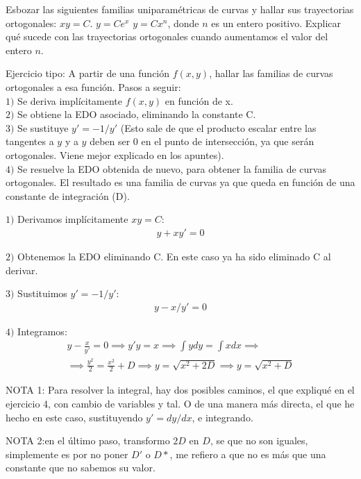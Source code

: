 \documentclass[nochap]{apuntes}
\begin{document}
\newpage
\begin{problem}[8]
Esbozar las siguientes familias uniparamétricas de curvas y hallar sus trayectorias ortogonales:
\ppart $xy=C$.
\ppart $y=Ce^x$
\ppart $y=Cx^n$, donde $n$ es un entero positivo. Explicar qué sucede con las trayectorias ortogonales cuando aumentamos el valor del entero $n$.

\solution

\begin{expla}
Ejercicio tipo: A partir de una función $f(x,y)$, hallar las familias de curvas ortogonales a esa función. Pasos a seguir:\\
$1)$ Se deriva implícitamente $f(x,y)$ en función de x.\\
$2)$ Se obtiene la EDO asociado, eliminando la constante C.\\
$3)$ Se sustituye $y'=-1/y'$ (Esto sale de que el producto escalar entre las tangentes a $y$ y a $y$ deben ser 0 en el punto de intersección, ya que serán ortogonales. Viene mejor explicado en los apuntes).\\
$4)$ Se resuelve la EDO obtenida de nuevo, para obtener la familia de curvas ortogonales. El resultado es una familia de curvas ya que queda en función de una constante de integración (D).
\end{expla}
\spart
$1)$ Derivamos implícitamente $xy=C$:
\begin{gather*}
y+xy'=0
\end{gather*}

$2)$ Obtenemos la EDO eliminando C. En este caso ya ha sido eliminado C al derivar.

$3)$ Sustituimos  $y'=-1/y'$:
\begin{gather*}
y-x/y'=0
\end{gather*}

$4)$ Integramos:
\begin{gather*}
y-\frac{x}{y'}=0 \implies y'y=x \implies \int ydy=\int xdx \implies \\ \implies \frac{y^2}{2}=\frac{x^2}{2}+D \implies y=\sqrt{x^2+2D} \implies y=\sqrt{x^2+D}
\end{gather*}

\begin{expla}
NOTA 1: Para resolver la integral, hay dos posibles caminos, el que expliqué en el ejercicio 4, con cambio de variables y tal. O de una manera más directa, el que he hecho en este caso, sustituyendo $y'=dy/dx$, e integrando.

NOTA 2:en el último paso, transformo $2D$ en $D$, se que no son iguales, simplemente es por no poner $D'$ o $D*$, me refiero a que no es más que una constante que no sabemos su valor.
\end{expla}



\end{problem}
\end{document}
